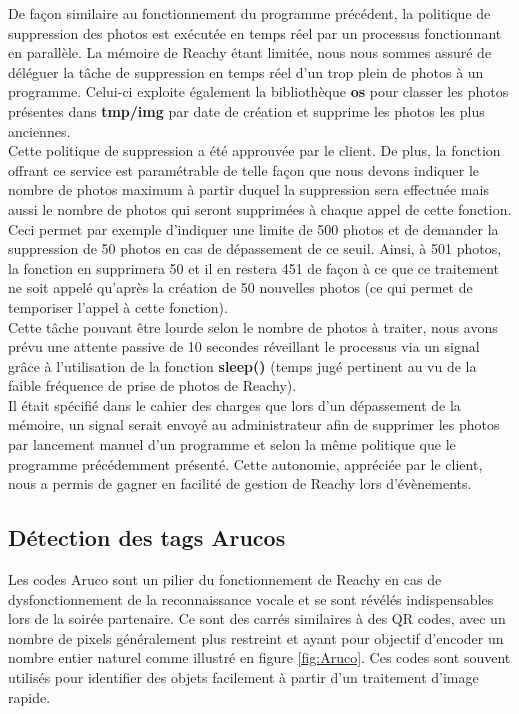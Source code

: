 \documentclass[a4paper,french]{article}
\begin{document}
De façon similaire au fonctionnement du programme précédent, la politique de suppression des photos est exécutée en temps réel par un processus fonctionnant en parallèle. La mémoire de Reachy étant limitée, nous nous sommes assuré de déléguer la tâche de suppression en temps réel d'un trop plein de photos à un programme. Celui-ci exploite également la bibliothèque \textbf{os} pour classer les photos présentes dans \textbf{tmp/img} par date de création et supprime les photos les plus anciennes.\\
Cette politique de suppression a été approuvée par le client. De plus, la fonction offrant ce service est paramétrable de telle façon que nous devons indiquer le nombre de photos maximum à partir duquel la suppression sera effectuée mais aussi le nombre de photos qui seront supprimées à chaque appel de cette fonction.\\
Ceci permet par exemple d'indiquer une limite de 500 photos et de demander la suppression de 50 photos en cas de dépassement de ce seuil. Ainsi, à 501 photos, la fonction en supprimera 50 et il en restera 451 de façon à ce que ce traitement ne soit appelé qu'après la création de 50 nouvelles photos (ce qui permet de temporiser l'appel à cette fonction).\\

Cette tâche pouvant être lourde selon le nombre de photos à traiter, nous avons prévu une attente passive de 10 secondes réveillant le processus via un signal grâce à l'utilisation de la fonction \textbf{sleep()} (temps jugé pertinent au vu de la faible fréquence de prise de photos de Reachy).\\
Il était spécifié dans le cahier des charges que lors d'un dépassement de la mémoire, un signal serait envoyé au administrateur afin de supprimer les photos par lancement manuel d'un programme et selon la même politique que le programme précédemment présenté. Cette autonomie, appréciée par le client, nous a permis de gagner en facilité de gestion de Reachy lors d'évènements.

\subsection{Détection des tags Arucos}
Les codes Aruco sont un pilier du fonctionnement de Reachy en cas de dysfonctionnement de la reconnaissance vocale et se sont révélés indispensables lors de la soirée partenaire. Ce sont des carrés similaires à des QR codes, avec un nombre de pixels généralement plus restreint et ayant pour objectif d'encoder un nombre entier naturel comme illustré en figure \ref{fig:Aruco}. Ces codes sont souvent utilisés pour identifier des objets facilement à partir d'un traitement d'image rapide.\\
\end{document}
